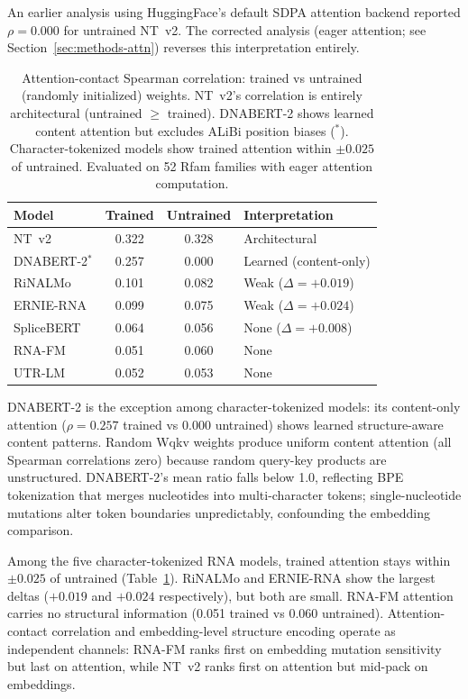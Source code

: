 \documentclass[11pt]{article}
\begin{document}
An earlier analysis using HuggingFace's default SDPA attention
backend reported $\rho = 0.000$ for untrained NT~v2. The corrected
analysis (eager attention; see Section~\ref{sec:methods-attn})
reverses this interpretation entirely.

\begin{table}[htbp]
\centering
\caption{Attention-contact Spearman correlation: trained vs
untrained (randomly initialized) weights. NT~v2's correlation is
entirely architectural (untrained $\geq$ trained). DNABERT-2 shows
learned content attention but excludes ALiBi position biases ($^*$).
Character-tokenized models show trained attention within
$\pm 0.025$ of untrained. Evaluated on 52 Rfam families with eager
attention computation.}
\label{tab:attn_trained_untrained}
\small
\begin{tabular}{@{}lccl@{}}
\toprule
\textbf{Model} & \textbf{Trained} & \textbf{Untrained} &
  \textbf{Interpretation} \\
\midrule
NT~v2      & 0.322 & 0.328 & Architectural \\
DNABERT-2$^*$  & 0.257 & 0.000 & Learned (content-only) \\
RiNALMo    & 0.101 & 0.082 & Weak ($\Delta = +0.019$) \\
ERNIE-RNA  & 0.099 & 0.075 & Weak ($\Delta = +0.024$) \\
SpliceBERT & 0.064 & 0.056 & None ($\Delta = +0.008$) \\
RNA-FM     & 0.051 & 0.060 & None \\
UTR-LM     & 0.052 & 0.053 & None \\
\bottomrule
\end{tabular}
\end{table}

DNABERT-2 is the exception among character-tokenized models: its
content-only attention ($\rho = 0.257$ trained vs $0.000$ untrained)
shows learned structure-aware content patterns. Random Wqkv weights
produce uniform content attention (all Spearman correlations zero)
because random query-key products are unstructured.
DNABERT-2's mean ratio falls below 1.0, reflecting BPE tokenization
that merges nucleotides into multi-character tokens;
single-nucleotide mutations alter token boundaries unpredictably,
confounding the embedding comparison.

Among the five character-tokenized RNA models, trained attention
stays within $\pm 0.025$ of untrained
(Table~\ref{tab:attn_trained_untrained}). RiNALMo and ERNIE-RNA
show the largest deltas ($+0.019$ and $+0.024$ respectively), but
both are small. RNA-FM attention carries no structural information
(0.051 trained vs 0.060 untrained). Attention-contact correlation
and embedding-level structure encoding operate as independent
channels: RNA-FM ranks first on embedding mutation sensitivity but
last on attention, while NT~v2 ranks first on attention but
mid-pack on embeddings.
\end{document}
